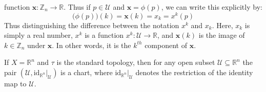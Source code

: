 \documentclass{article}                                                        %
\begin{document}
        function $\mathbf{x}:\mathbb{Z}_{n}\rightarrow\mathbb{R}$. Thus if
        $p\in\mathcal{U}$ and $\mathbf{x}=\phi(p)$, we can write this
        explicitly by:
        \begin{equation}
            \big(\phi(p)\big)(k)=\mathbf{x}(k)=x_{k}=x^{k}(p)
        \end{equation}
        Thus distinguishing the difference between the notation $x^{k}$ and
        $x_{k}$. Here, $x_{k}$ is simply a real number, $x^{k}$ is a function
        $x^{k}:\mathcal{U}\rightarrow\mathbb{R}$, and $\mathbf{x}(k)$ is the
        image of $k\in\mathbb{Z}_{n}$ under $\mathbf{x}$. In other words, it is
        the $k^{th}$ component of $\mathbf{x}$.
        \begin{example}
            If $X=\mathbb{R}^{n}$ and $\tau$ is the standard topology, then
            for any open subset $\mathcal{U}\subseteq\mathbb{R}^{n}$ the
            pair $(\mathcal{U},\textrm{id}_{\mathbb{R}^{n}}|_{\mathcal{U}})$
            is a chart, where $\textrm{id}_{\mathbb{R}^{n}}|_{\mathcal{U}}$
            denotes the restriction of the identity map to $\mathcal{U}$.
        \end{example}
\end{document}
